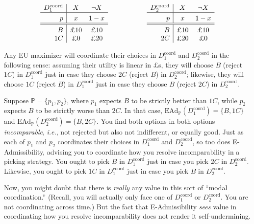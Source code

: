 \documentclass[a4paper]{article}
\newcommand\Tstrut{\rule{0pt}{2.6ex}}       %
\newcommand\Bstrut{\rule[-0.9ex]{0pt}{0pt}} %
\renewcommand\P{\mathbb{P}} %
\newcommand\EU{\mathrm{EU}}
\newcommand\EAd{\mathrm{EAd}}
\newcommand{\IP}{\P}
\newcommand{\todoold}[2][]{\todo[backgroundcolor=white,bordercolor=orange!10,linecolor=gray!10, #1,caption={},textcolor=gray]{Pre-rev: #2}}
\newenvironment{CCM rewritten}
{\begingroup\color{blue}} %
{\endgroup}              %
\begin{document}
	\label{eg:coord}
	$$
	\begin{array}{r|cc}
		D^{\mathrm{coord}}_1 & X & \neg X  \Bstrut \\\hline \Tstrut		p & x & 1-x \Bstrut \\\hline \hline\Tstrut 
		B & \text{\pounds 10} & \text{\pounds 10}   \\
		1C & \text{\pounds 0} & \text{\pounds 20} 
	\end{array}\hspace{20mm}
	\begin{array}{r|cc}
		D^{\mathrm{coord}}_2 & X & \neg X  \Bstrut \\\hline \Tstrut		p & x & 1-x \Bstrut \\\hline \hline\Tstrut 
		B & \text{\pounds 10} & \text{\pounds 10}   \\
		2C & \text{\pounds 20} & \text{\pounds 0} 
	\end{array}
	$$
	
	Any $\EU$-maximizer will coordinate their choices in $D^{\mathrm{coord}}_1$ and $D^{\mathrm{coord}}_2$ in the following sense: assuming their utility is linear in $\pounds$s, they will choose $B$ (reject $1C$) in $D^{\mathrm{coord}}_1$ just in case they choose $2C$ (reject $B$) in $D^{\mathrm{coord}}_2$; likewise, they will choose $1C$ (reject $B$) in $D^{\mathrm{coord}}_1$ just in case they choose $B$ (reject $2C$) in $D^{\mathrm{coord}}_2$. 
	
	Suppose $\IP = \{p_1, p_2\}$, where $p_1$ expects $B$ to be strictly better than $1C$, while $p_2$ expects $B$ to be strictly worse than $2C$. In that case, $\EAd_\IP(D^{\mathrm{coord}}_1)=\{B,1C\}$ and $\EAd_\IP(D^{\mathrm{coord}}_2)=\{B,2C\}$. You find both options in both options \emph{incomparable}, \emph{i.e.}, not rejected but also not indifferent, or equally good. Just as each of $p_1$ and $p_2$ coordinates their choices in $D^{\mathrm{coord}}_1$ and $D^{\mathrm{coord}}_2$, so too does E-Admissibility, advising you to coordinate how you resolve incomparability in a picking strategy. You ought to pick $B$ in $D^{\mathrm{coord}}_1$ just in case you pick $2C$ in $D^{\mathrm{coord}}_2$. Likewise, you ought to pick $1C$ in $D^{\mathrm{coord}}_1$ just in case you pick $B$ in $D^{\mathrm{coord}}_2$. 

	
	
	Now, you might doubt that there is \emph{really} any value in this sort of ``modal coordination.'' (Recall, you will actually only face one of $D^{\mathrm{coord}}_1$ or $D^{\mathrm{coord}}_2$. You are not coordinating across time.) But the fact that E-Admissibility \emph{sees} value in coordinating how you resolve incomparability does not render it self-undermining.
	
\end{document}
